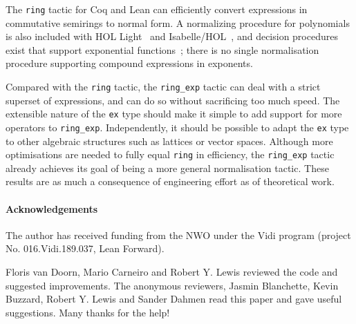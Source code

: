 \documentclass{llncs}
\newcommand{\lean}[1]{\texttt{#1}\xspace} %
\newcommand{\ex}{\lean{ex}}
\newcommand{\ring}{\lean{ring}}
\newcommand{\ringexp}{\lean{ring\_exp}}
\begin{document}
The \ring tactic for Coq and Lean can efficiently convert expressions in commutative semirings to normal form.
A normalizing procedure for polynomials is also included with HOL Light~\cite{hol_light} and Isabelle/HOL~\cite{isabelle_hol},
and decision procedures exist that support exponential functions~\cite{resolution-rcf};
there is no single normalisation procedure supporting compound expressions in exponents.

Compared with the \ring tactic, the \ringexp tactic can deal with a strict superset of expressions,
and can do so without sacrificing too much speed.
The extensible nature of the \ex type should make it simple to add support for more operators to \ringexp.
Independently, it should be possible to adapt the \ex type to other algebraic structures
such as lattices or vector spaces.
Although more optimisations are needed to fully equal \ring in efficiency,
the \ringexp tactic already achieves its goal of being a more general normalisation tactic.
These results are as much a consequence of engineering effort as of theoretical work.


\paragraph{Acknowledgements}
The author has received funding from the NWO under the Vidi program (project
No. 016.Vidi.189.037, Lean Forward).

Floris van Doorn, Mario Carneiro and Robert Y. Lewis reviewed the code and
suggested improvements.
The anonymous reviewers, Jasmin Blanchette, Kevin Buzzard, Robert Y. Lewis and Sander Dahmen read this paper and gave useful suggestions.
Many thanks for the help!

\printbibliography
\end{document}
